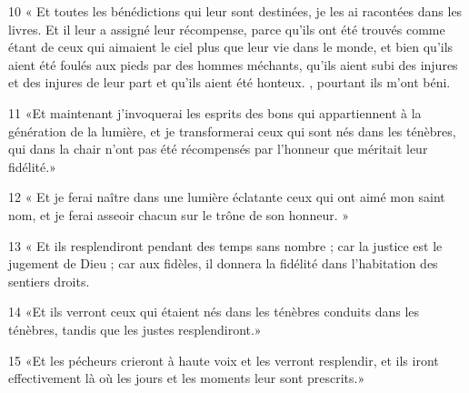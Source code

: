 \par 10 « Et toutes les bénédictions qui leur sont destinées, je les ai racontées dans les livres. Et il leur a assigné leur récompense, parce qu'ils ont été trouvés comme étant de ceux qui aimaient le ciel plus que leur vie dans le monde, et bien qu'ils aient été foulés aux pieds par des hommes méchants, qu'ils aient subi des injures et des injures de leur part et qu'ils aient été honteux. , pourtant ils m’ont béni.
\par 11 «Et maintenant j'invoquerai les esprits des bons qui appartiennent à la génération de la lumière, et je transformerai ceux qui sont nés dans les ténèbres, qui dans la chair n'ont pas été récompensés par l'honneur que méritait leur fidélité.»
\par 12 « Et je ferai naître dans une lumière éclatante ceux qui ont aimé mon saint nom, et je ferai asseoir chacun sur le trône de son honneur. »
\par 13 « Et ils resplendiront pendant des temps sans nombre ; car la justice est le jugement de Dieu ; car aux fidèles, il donnera la fidélité dans l'habitation des sentiers droits.
\par 14 «Et ils verront ceux qui étaient nés dans les ténèbres conduits dans les ténèbres, tandis que les justes resplendiront.»
\par 15 «Et les pécheurs crieront à haute voix et les verront resplendir, et ils iront effectivement là où les jours et les moments leur sont prescrits.»

